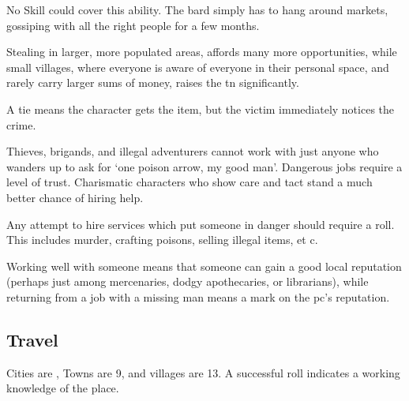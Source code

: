 \begin{multicols}{2}
No Skill could cover this ability.
The bard simply has to hang around markets, gossiping with all the right people for a few months.

Stealing in larger, more populated areas, affords many more opportunities, while small \glspl{village}, where everyone is aware of everyone in their personal space, and rarely carry larger sums of money, raises the \gls{tn} significantly.


A tie means the character gets the item, but the victim immediately notices the crime.

\larcenyChart

Thieves, brigands, and illegal adventurers cannot work with just anyone who wanders up to ask for `one poison arrow, my good man'.
Dangerous jobs require a level of trust.
Charismatic characters who show care and tact stand a much better chance of hiring help.


Any attempt to hire services which put someone in danger should require a roll.
This includes murder, crafting poisons, selling illegal items, et c.

Working well with someone means that someone can gain a good local reputation (perhaps just among mercenaries, dodgy apothecaries, or librarians), while returning from a job with a missing man means a mark on the \gls{pc}'s reputation.

\subsection{Travel}

Cities are \tn[7], Towns are 9, and \glspl{village} are 13.
A successful roll indicates a working knowledge of the place.


\end{multicols}
